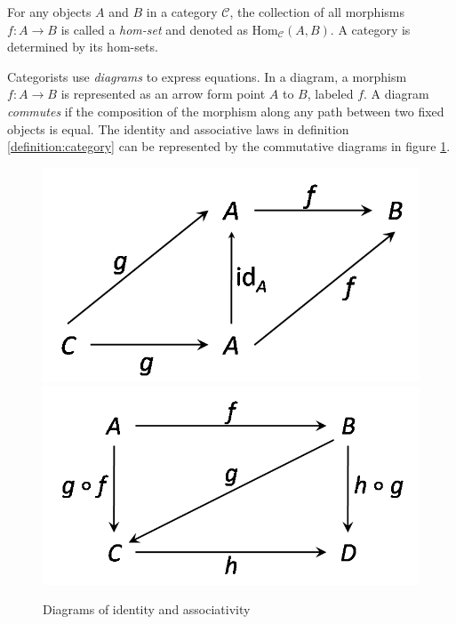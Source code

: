 For any objects $ A $ and $ B $ in a category $ \mathcal{C} $, the collection of all morphisms $ f: A \to B $ is called a \emph{hom-set} and denoted as $ \text{Hom}_\mathcal{C}(A,B) $. A category is determined by its hom-sets.

Categorists use \emph{diagrams} to express equations. In a diagram, a morphism $ f: A \to B $ is represented as an arrow form point $ A $ to $ B $, labeled $ f $. A diagram \emph{commutes} if the composition of the morphism along any path between two fixed objects is equal. The identity and associative laws in definition \ref{definition:category} can be represented by the commutative diagrams in figure \ref{figure:cat_id_asso}.
\begin{figure}[h!]
\centering
\includegraphics[scale=0.48]{./images/cat_id}
\includegraphics[scale=0.48]{./images/cat_asso}
\caption{Diagrams of identity and associativity}
\label{figure:cat_id_asso}
\end{figure}

